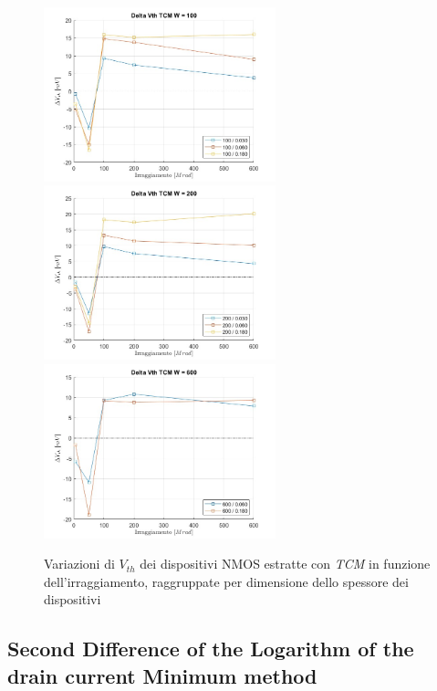 \documentclass[12pt, letterpaper]{book}
\begin{document}
\begin{figure}[H]
  \centering
  \includegraphics[width=0.6\textwidth]{sovrapposizione-deltaVth-TCM-N100}
  \includegraphics[width=0.6\textwidth]{sovrapposizione-deltaVth-TCM-N200}
  \includegraphics[width=0.6\textwidth]{sovrapposizione-deltaVth-TCM-N600}
  \caption{Variazioni di $V_{th}$ dei dispositivi NMOS estratte con \emph{TCM} in funzione dell'irraggiamento, raggruppate per dimensione dello spessore dei dispositivi}
\end{figure}






\subsection{Second Difference of the Logarithm of the drain current Minimum method}
\end{document}
